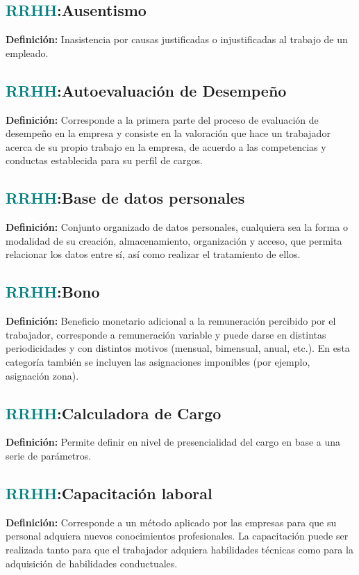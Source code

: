 \documentclass[12pt]{article}
\begin{document}
\subsection{\textcolor{teal}{RRHH}:{Ausentismo}}
\textbf{Definición:} Inasistencia por causas justificadas o injustificadas al trabajo de un empleado.
\subsection{\textcolor{teal}{RRHH}:{Autoevaluación de Desempeño}}
\textbf{Definición:} Corresponde a la primera parte del proceso de evaluación de desempeño en la empresa y consiste en la valoración que hace un trabajador acerca de su propio trabajo en la empresa, de acuerdo a las competencias y conductas establecida para su perfil de cargos.
\subsection{\textcolor{teal}{RRHH}:{Base de datos personales}}
\textbf{Definición:} Conjunto organizado de datos personales, cualquiera sea la forma o modalidad de su creación, almacenamiento, organización y acceso, que permita relacionar los datos entre sí, así como realizar el tratamiento de ellos.
\subsection{\textcolor{teal}{RRHH}:{Bono}}
\textbf{Definición:} Beneficio monetario adicional a la remuneración percibido por el trabajador, corresponde a remuneración variable y puede darse en distintas periodicidades y con distintos motivos (mensual, bimensual, anual, etc.). En esta categoría también se incluyen las asignaciones imponibles (por ejemplo, asignación zona).
\subsection{\textcolor{teal}{RRHH}:{Calculadora de Cargo}}
\textbf{Definición:} Permite definir en nivel de presencialidad del cargo en base a una serie de parámetros. 
\subsection{\textcolor{teal}{RRHH}:{Capacitación laboral}}
\textbf{Definición:} Corresponde a un método aplicado por las empresas para que su personal adquiera nuevos conocimientos profesionales. La capacitación puede ser realizada tanto para que el trabajador adquiera habilidades técnicas como para la adquisición de habilidades conductuales.
\end{document}
